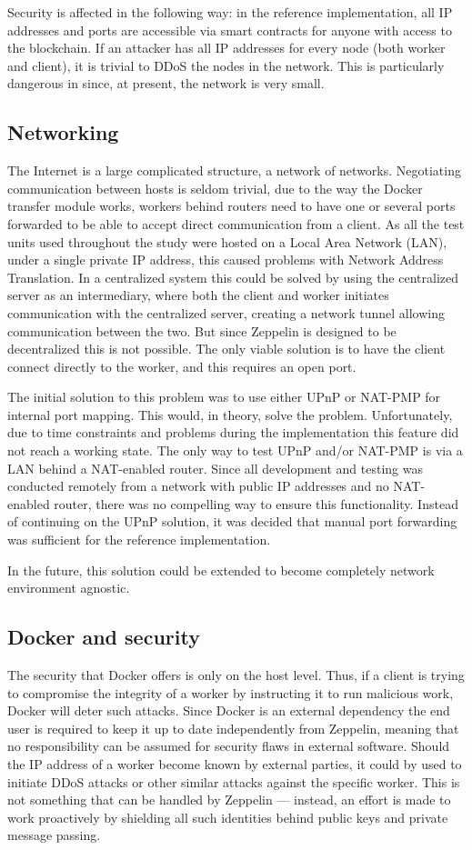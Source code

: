 Security is affected in the following way: in the reference implementation, all IP addresses and ports are accessible via smart contracts for anyone with access to the blockchain. If an attacker has all IP addresses for every node (both worker and client), it is trivial to DDoS the nodes in the network. This is particularly dangerous in since, at present, the network is very small. 

\subsection{Networking}
The Internet is a large complicated structure, a network of networks. Negotiating communication between hosts is seldom trivial, due to the way the Docker transfer module works, workers behind routers need to have one or several ports forwarded to be able to accept direct communication from a client. As all the test units used throughout the study were hosted on a Local Area Network (LAN), under a single private IP address, this caused problems with Network Address Translation. In a centralized system this could be solved by using the centralized server as an intermediary, where both the client and worker initiates communication with the centralized server, creating a network tunnel allowing communication between the two. But since Zeppelin is designed to be decentralized this is not possible. The only viable solution is to have the client connect directly to the worker, and this requires an open port.

The initial solution to this problem was to use either UPnP or NAT-PMP for internal port mapping. This would, in theory, solve the problem. Unfortunately, due to time constraints and problems during the implementation this feature did not reach a working state. The only way to test UPnP and/or NAT-PMP is via a LAN behind a NAT-enabled router. Since all development and testing was conducted remotely from a network with public IP addresses and no NAT-enabled router, there was no compelling way to ensure this functionality. Instead of continuing on the UPnP solution, it was decided that manual port forwarding was sufficient for the reference implementation.

In the future, this solution could be extended to become completely network environment agnostic.

\subsection{Docker and security}
The security that Docker offers is only on the host level. Thus, if a client is trying to compromise the integrity of a worker by instructing it to run malicious work, Docker will deter such attacks. Since Docker is an external dependency the end user is required to keep it up to date independently from Zeppelin, meaning that no responsibility can be assumed for security flaws in external software. Should the IP address of a worker become known by external parties, it could by used to initiate DDoS attacks or other similar attacks against the specific worker. This is not something that can be handled by Zeppelin --- instead, an effort is made to work proactively by shielding all such identities behind public keys and private message passing.

